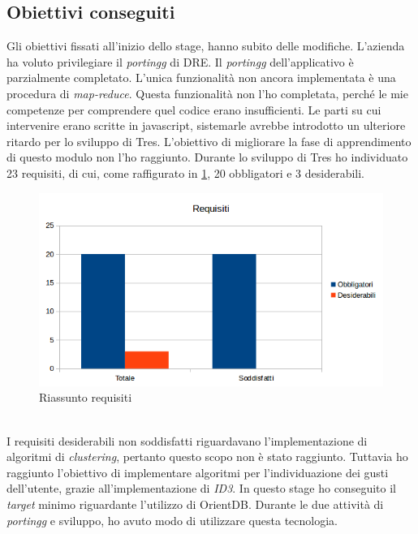 \subsection{Obiettivi conseguiti}
Gli obiettivi fissati all'inizio dello stage, hanno subito delle modifiche. L'azienda ha voluto privilegiare il \emph{\gls{portingg}} di DRE. Il \emph{\gls{portingg}} dell'applicativo è parzialmente completato. L'unica funzionalità non ancora implementata è una procedura di \emph{map-reduce}. Questa funzionalità non l'ho completata, perché le mie competenze per comprendere quel codice erano insufficienti. Le parti su cui intervenire erano scritte in javascript, sistemarle avrebbe introdotto un ulteriore ritardo per lo sviluppo di Tres. L'obiettivo di migliorare la fase di apprendimento di questo modulo non l'ho raggiunto. Durante lo sviluppo di Tres ho individuato 23 requisiti, di cui, come raffigurato in \ref{fig:graficorequisiti}, 20 obbligatori e 3 desiderabili.  
\begin{figure}[h]
\centering
\includegraphics[scale=0.64]{immagini/graficorequisiti}
\caption{Riassunto requisiti}
\label{fig:graficorequisiti}
\end{figure}
\\I requisiti desiderabili non soddisfatti riguardavano l'implementazione di algoritmi di \emph{clustering}, pertanto questo scopo non è stato raggiunto.
Tuttavia ho raggiunto l'obiettivo di implementare algoritmi per l'individuazione dei gusti dell'utente, grazie all'implementazione di \emph{ID3}. In questo stage ho conseguito il \emph{target} minimo riguardante l'utilizzo di OrientDB. Durante le due attività di \emph{\gls{portingg}} e sviluppo, ho avuto modo di utilizzare questa tecnologia. 

